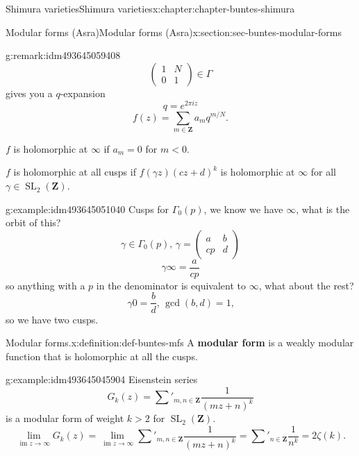 \documentclass[oneside,10pt,]{book}
\newcommand{\terminology}[1]{\textbf{#1}}
\numberwithin{equation}{section}
\newcommand{\ZZ}{\mathbf{Z}}
\DeclareMathOperator{\im}{im}
\DeclareMathOperator{\SL}{SL}
\newcommand{\lt}{<}
\newcommand{\gt}{>}
\newcommand{\amp}{&}
\begin{document}
\begin{chapterptx}{Shimura varieties}{}{Shimura varieties}{}{}{x:chapter:chapter-buntes-shimura}
\begin{sectionptx}{Modular forms (Asra)}{}{Modular forms (Asra)}{}{}{x:section:sec-buntes-modular-forms}
\begin{remark}{}{g:remark:idm493645059408}
\begin{equation*}
\begin{pmatrix} 1\amp N \\ 0 \amp 1 \end{pmatrix} \in \Gamma
\end{equation*}
gives you a \(q\)-expansion%
\begin{equation*}
q=  e^{2\pi i z}
\end{equation*}
%
\begin{equation*}
f(z) = \sum_{m\in \ZZ} a_m  q^{m/N}\text{.}
\end{equation*}
%
\par
\(f\) is holomorphic at \(\infty\) if \(a_m  = 0\) for \(m \lt 0\).%
\par
\(f\) is holomorphic at all cusps if \(f(\gamma z)(cz+d)^k\) is holomorphic at \(\infty\) for all \(\gamma \in \SL_2(\ZZ)\).%
\end{remark}
\begin{example}{}{g:example:idm493645051040}%
Cusps for \(\Gamma_0(p)\), we know we have \(\infty\), what is the orbit of this?%
\begin{equation*}
\gamma\in \Gamma_0(p),\, \gamma  =  \begin{pmatrix} a\amp b \\ cp \amp d    \end{pmatrix}
\end{equation*}
%
\begin{equation*}
\gamma \infty  = \frac{a}{cp}
\end{equation*}
so anything with  a \(p\) in the denominator is equivalent to \(\infty\), what about the rest?%
\begin{equation*}
\gamma 0  = \frac{b}{d}, \, \gcd(b,d)  =1\text{,}
\end{equation*}
so we have two cusps.%
\end{example}
\begin{definition}{Modular forms.}{x:definition:def-buntes-mfs}%
A \terminology{modular form} is  a weakly modular function that is holomorphic at all the cusps.%
\end{definition}
\begin{example}{}{g:example:idm493645045904}%
Eisenstein series%
\begin{equation*}
G_k(z) = \sum'_{m,n\in \ZZ} \frac{1}{(mz+n)^k}
\end{equation*}
is a modular form of weight \(k \gt 2\) for \(\SL_2(\ZZ)\).%
\begin{equation*}
\lim_{\im z\to \infty} G_k(z) = \lim_{\im z\to \infty} \sum'_{m,n\in \ZZ} \frac{1}{(mz+n)^k} = \sum'_{n\in \ZZ} \frac{1}{n^k} = 2\zeta(k)\text{.}

\end{equation*}
\end{example}
\end{sectionptx}
\end{chapterptx}
\end{document}
